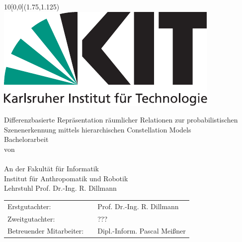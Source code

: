 \newcommand{\diameter}{20}
\newcommand{\xone}{-50}
\newcommand{\xtwo}{450}
\newcommand{\yone}{60}
\newcommand{\ytwo}{-700}

\newcommand{\timestart}{11. Juni 2017}
\newcommand{\timeend}{10. September 2017}
\newcommand{\submissiontime}{DD. MM. 20XX}

\begin{titlepage}

  \begin{textblock}{10}[0,0](1.75,1.125)
    \includegraphics[width=.3\textwidth]{bilder/Kitlogo_de_rgb.pdf}
  \end{textblock}

  \vspace*{3.5cm}
  \begin{center}
    \Huge{Differenzbasierte Repräsentation räumlicher Relationen zur probabilistischen Szenenerkennung mittels hierarchischen Constellation Models}\\
    \vspace*{2cm}
    \Large{Bachelorarbeit\\von}\\
    \vspace*{1cm}
    \huge{\myname}\\
    \vspace*{1cm}
    \Large{An der Fakultät für Informatik\\Institut für Anthropomatik und Robotik\\Lehrstuhl Prof. Dr.-Ing. R. Dillmann}
  \end{center}

  \vspace*{1cm}
  \Large{
    \begin{center}
      \begin{tabular}[ht]{l c l}
        Erstgutachter: & \hfill  & Prof. Dr.-Ing. R. Dillmann\\
        Zweitgutachter: & \hfill  & ???\\
        Betreuender Mitarbeiter: & \hfill  & Dipl.-Inform. Pascal Meißner\\
      \end{tabular}
    \end{center}
  }


\end{titlepage}
